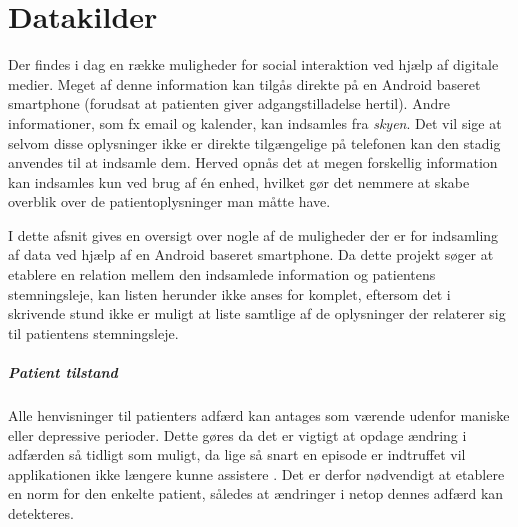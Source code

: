 \chapter{Datakilder}\label{datasamling}
Der findes i dag en række muligheder for social interaktion ved hjælp af digitale medier.
Meget af denne information kan tilgås direkte på en Android baseret smartphone (forudsat at patienten giver adgangstilladelse hertil).
Andre informationer, som fx email og kalender, kan indsamles fra \textit{skyen}.
Det vil sige at selvom disse oplysninger ikke er direkte tilgængelige på telefonen kan den stadig anvendes til at indsamle dem.
Herved opnås det at megen forskellig information kan indsamles kun ved brug af én enhed, hvilket gør det nemmere at skabe overblik over de patientoplysninger man måtte have.

I dette afsnit gives en oversigt over nogle af de muligheder der er for indsamling af data ved hjælp af en Android baseret smartphone.
Da dette projekt søger at etablere en relation mellem den indsamlede information og patientens stemningsleje, kan listen herunder ikke anses for komplet, eftersom det i skrivende stund ikke er muligt at liste samtlige af de oplysninger der relaterer sig til patientens stemningsleje.

\paragraph{Patient tilstand}
Alle henvisninger til patienters adfærd kan antages som værende udenfor maniske eller depressive perioder.
Dette gøres da det er vigtigt at opdage ændring i adfærden så tidligt som muligt, da lige så snart en episode er indtruffet vil applikationen ikke længere kunne assistere .
Det er derfor nødvendigt at etablere en norm for den enkelte patient, således at ændringer i netop dennes adfærd kan detekteres.








